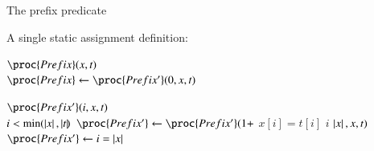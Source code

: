 %
\begin{frame}{The prefix predicate}

A single static assignment definition:

\begin{codebox}
\(\proc{Prefix} (x, t)\)\\
\li \(\proc{Prefix} \gets \proc{Prefix'}(0,x,t)\)
\end{codebox}

\begin{codebox}
\(\proc{Prefix'} (i,x, t)\)\\
\li \If \(i < \text{min}(\left\lvert\smash{x}\right\rvert, \left\lvert\smash{t}\right\rvert\!)\)
\li \Then \(\proc{Prefix'} \gets \proc{Prefix'}(1 +\)  \(x[i] = t[i]\)  \(i\)
 \(\left\lvert\smash{x}\right\rvert, x, t)\)
\li \Else \(\proc{Prefix'} \gets i = \len{x}\)
    \End
\end{codebox}

\end{frame}
